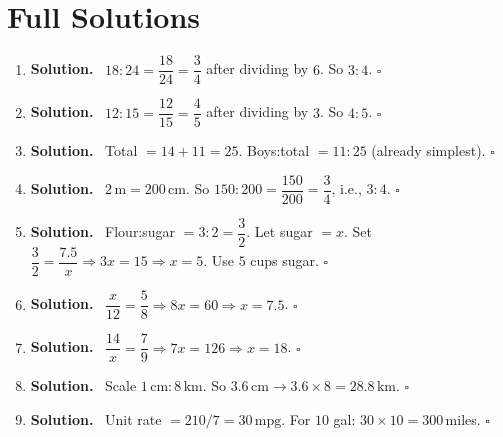 \documentclass[12pt]{article}
\newenvironment{solution}{\par\noindent\textbf{Solution.}\ }{\hfill$\square$\par}
\begin{document}
\section*{Full Solutions}
\begin{enumerate}

\item \begin{solution}
$18:24 = \dfrac{18}{24} = \dfrac{3}{4}$ after dividing by $6$. So $3:4$.
\end{solution}

\item \begin{solution}
$12:15 = \dfrac{12}{15} = \dfrac{4}{5}$ after dividing by $3$. So $4:5$.
\end{solution}

\item \begin{solution}
Total $=14+11=25$. Boys:total $=11:25$ (already simplest).
\end{solution}

\item \begin{solution}
$2\,\text{m}=200\,\text{cm}$. So $150:200=\dfrac{150}{200}=\dfrac{3}{4}$, i.e., $3:4$.
\end{solution}

\item \begin{solution}
Flour:sugar $=3:2=\dfrac{3}{2}$. Let sugar $=x$. Set $\dfrac{3}{2}=\dfrac{7.5}{x}\Rightarrow 3x=15\Rightarrow x=5$. Use $5$ cups sugar.
\end{solution}

\item \begin{solution}
$\dfrac{x}{12}=\dfrac{5}{8}\Rightarrow 8x=60\Rightarrow x=7.5$.
\end{solution}

\item \begin{solution}
$\dfrac{14}{x}=\dfrac{7}{9}\Rightarrow 7x=126\Rightarrow x=18$.
\end{solution}

\item \begin{solution}
Scale $1\,\text{cm}:8\,\text{km}$. So $3.6\,\text{cm}\to 3.6\times 8=28.8\,\text{km}$.
\end{solution}

\item \begin{solution}
Unit rate $=210/7=30\,\text{mpg}$. For $10$ gal: $30\times10=300\,$miles.
\end{solution}


\end{enumerate}
\end{document}
